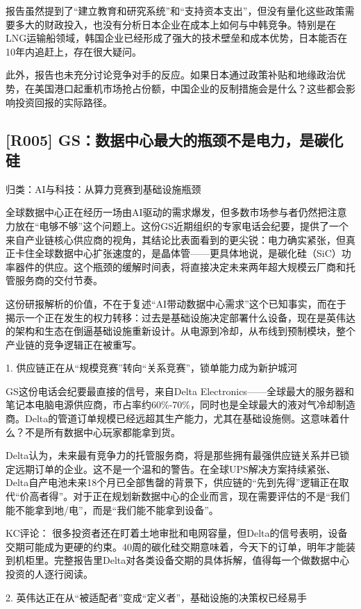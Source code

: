 \documentclass[11pt]{ctexart}
\begin{document}
报告虽然提到了“建立教育和研究系统”和“支持资本支出”，但没有量化这些政策需要多大的财政投入，也没有分析日本企业在成本上如何与中韩竞争。特别是在LNG运输船领域，韩国企业已经形成了强大的技术壁垒和成本优势，日本能否在10年内追赶上，存在很大疑问。

此外，报告也未充分讨论竞争对手的反应。如果日本通过政策补贴和地缘政治优势，在美国港口起重机市场抢占份额，中国企业的反制措施会是什么？这些都会影响投资回报的实际路径。

\subsection{[R005] GS：数据中心最大的瓶颈不是电力，是碳化硅}
{\small\color{refgray}归类：AI与科技：从算力竞赛到基础设施瓶颈}

全球数据中心正在经历一场由AI驱动的需求爆发，但多数市场参与者仍然把注意力放在“电够不够”这个问题上。这份GS近期组织的专家电话会纪要，提供了一个来自产业链核心供应商的视角，其结论比表面看到的更尖锐：电力确实紧张，但真正卡住全球数据中心扩张速度的，是晶体管——更具体地说，是碳化硅（SiC）功率器件的供应。这个瓶颈的缓解时间表，将直接决定未来两年超大规模云厂商和托管服务商的交付节奏。

这份研报解析的价值，不在于复述“AI带动数据中心需求”这个已知事实，而在于揭示一个正在发生的权力转移：过去是基础设施决定部署什么设备，现在是英伟达的架构和生态在倒逼基础设施重新设计。从电源到冷却，从布线到预制模块，整个产业链的竞争逻辑正在被重写。

1. 供应链正在从“规模竞赛”转向“关系竞赛”，锁单能力成为新护城河

GS这份电话会纪要最直接的信号，来自Delta Electronics——全球最大的服务器和笔记本电脑电源供应商，市占率约60\%-70\%，同时也是全球最大的液对气冷却制造商。Delta的管道订单规模已经远超其生产能力，尤其在基础设施侧。这意味着什么？不是所有数据中心玩家都能拿到货。

Delta认为，未来最有竞争力的托管服务商，将是那些拥有最强供应链关系并已锁定远期订单的企业。这不是一个温和的警告。在全球UPS解决方案持续紧张、Delta自产电池未来18个月已全部售罄的背景下，供应链的“先到先得”逻辑正在取代“价高者得”。对于正在规划新数据中心的企业而言，现在需要评估的不是“我们能不能拿到地/电”，而是“我们能不能拿到设备”。

KC评论： 很多投资者还在盯着土地审批和电网容量，但Delta的信号表明，设备交期可能成为更硬的约束。40周的碳化硅交期意味着，今天下的订单，明年才能装到机柜里。完整报告里Delta对各类设备交期的具体拆解，值得每一个做数据中心投资的人逐行阅读。

2. 英伟达正在从“被适配者”变成“定义者”，基础设施的决策权已经易手
\end{document}
